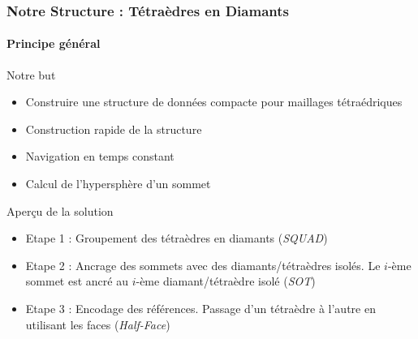 \documentclass[9pt]{beamer}
\begin{document}
\begin{frame}
\small
\frametitle{Notre Structure : Tétraèdres en Diamants}
\framesubtitle{Principe général}
\small
\begin{block}{Notre but}
\begin{itemize}
\item Construire une structure de données compacte pour maillages tétraédriques
\item Construction rapide de la structure
\item Navigation en temps constant
\item Calcul de l'hypersphère d'un sommet
\end{itemize}
\end{block}
\begin{block}{Aper\c cu de la solution}
\begin{itemize}
\item Etape 1 : Groupement des tétraèdres en diamants (\textit{SQUAD})
\item Etape 2 : Ancrage des sommets avec des diamants/tétraèdres isolés. Le $i$-ème sommet est ancré au $i$-ème diamant/tétraèdre isolé (\textit{SOT})
\item Etape 3 : Encodage des références. Passage d'un tétraèdre à l'autre en utilisant les faces (\textit{Half-Face})
\end{itemize}
\end{block}
\end{frame}
\end{document}
